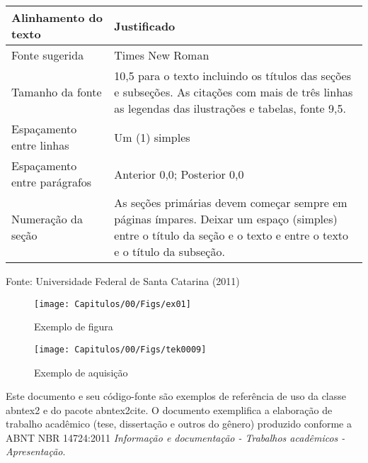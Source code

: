 \begin{table}[!htb]
\begin{center}
\begin{tabular}{ p{3cm} | p{6cm} }
			Alinhamento do texto           & Justificado                                                                                                                                                                        \\ \hline
			Fonte sugerida                 & Times New Roman                                                                                                                                                                    \\ \hline
			Tamanho da fonte               & 10,5 para o texto incluindo os títulos das seções e subseções. As citações com mais de três linhas as legendas das ilustrações e tabelas, fonte 9,5.                     \\ \hline
			Espaçamento entre linhas      & Um (1) simples                                                                                                                                                                     \\ \hline
			Espaçamento entre parágrafos & Anterior 0,0; Posterior 0,0                                                                                                                                                        \\ \hline
			Numeração da seção         & As seções  primárias devem  começar  sempre em páginas ímpares. Deixar um espaço (simples) entre o título da seção e o texto e  entre o texto e o título da subseção. \\  \hline
		\end{tabular}
	\end{center}
	Fonte: Universidade Federal de Santa Catarina (2011) \showfont
\end{table}


\begin{figure}
	\centering
	\texttt{[image: Capitulos/00/Figs/ex01]}
	\caption{Exemplo de figura}
	\label{fig:ex01}
\end{figure}

\begin{figure}
	\centering
	\texttt{[image: Capitulos/00/Figs/tek0009]}
	\caption{Exemplo de aquisição}
	\label{fig:tek0009}
\end{figure}

Este documento e seu código-fonte são exemplos de referência de uso da classe
\textsf{abntex2} e do pacote \textsf{abntex2cite}. O documento 
exemplifica a elaboração de trabalho acadêmico (tese, dissertação e outros do
gênero) produzido conforme a ABNT NBR 14724:2011 \emph{Informação e documentação
- Trabalhos acadêmicos - Apresentação}.

